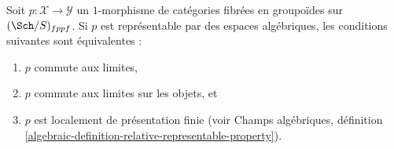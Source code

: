 \begin{lemma}
\label{lemma-representable-by-spaces-limit-preserving}
Soit $p : \mathcal{X} \to \mathcal{Y}$ un $1$-morphisme de catégories
fibrées en groupoïdes sur $(\Sch/S)_{fppf}$. Si $p$ est représentable par
des espaces algébriques, les conditions suivantes sont équivalentes :
\begin{enumerate}
\item $p$ commute aux limites,
\item $p$ commute aux limites sur les objets, et
\item $p$ est localement de présentation finie (voir Champs algébriques,
définition \ref{algebraic-definition-relative-representable-property}).
\end{enumerate}
\end{lemma}

